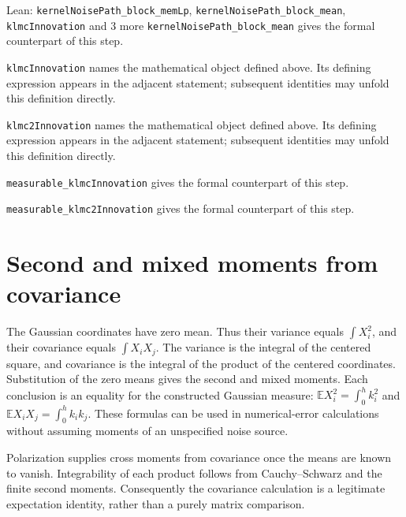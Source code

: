 \documentclass[11pt,a4paper]{article}
\begin{document}
\begin{leanbox}{Lean: \texttt{kernelNoisePath\_\allowbreak{}block\_\allowbreak{}memLp}, \texttt{kernelNoisePath\_\allowbreak{}block\_\allowbreak{}mean}, \texttt{klmcInnovation} and 3 more}
\texttt{kernel\allowbreak{}Noise\allowbreak{}Path\_\allowbreak{}block\_\allowbreak{}mean} gives the formal counterpart of this step.




\texttt{klmc\allowbreak{}Innovation} names the mathematical object defined above. Its defining expression appears in the adjacent statement; subsequent identities may unfold this definition directly.




\texttt{klmc2\allowbreak{}Innovation} names the mathematical object defined above. Its defining expression appears in the adjacent statement; subsequent identities may unfold this definition directly.




\texttt{measurable\_\allowbreak{}klmc\allowbreak{}Innovation} gives the formal counterpart of this step.




\texttt{measurable\_\allowbreak{}klmc2\allowbreak{}Innovation} gives the formal counterpart of this step.
\end{leanbox}

\section{\texorpdfstring{Second and mixed moments from covariance}{Second and mixed moments from covariance}}


The Gaussian coordinates have zero mean. Thus their variance equals \(\int X_i^2\), and their covariance equals \(\int X_iX_j\). The variance is the integral of the centered square, and covariance is the integral of the product of the centered coordinates. Substitution of the zero means gives the second and mixed moments. Each conclusion is an equality for the constructed Gaussian measure: \(\mathbb E X_i^2=\int_0^hk_i^2\) and \(\mathbb E X_iX_j=\int_0^hk_ik_j\). These formulas can be used in numerical-error calculations without assuming moments of an unspecified noise source.



Polarization supplies cross moments from covariance once the means are known to vanish. Integrability of each product follows from Cauchy–Schwarz and the finite second moments. Consequently the covariance calculation is a legitimate expectation identity, rather than a purely matrix comparison.
\end{document}
